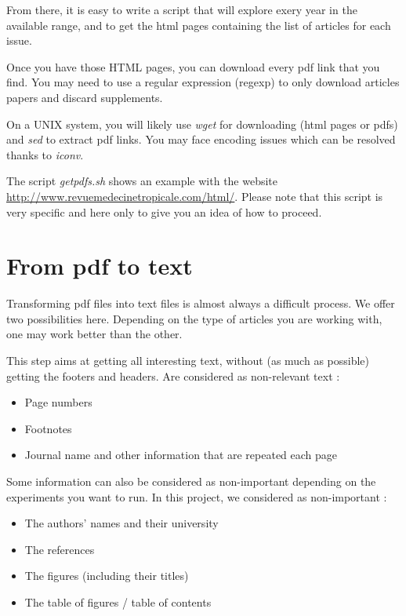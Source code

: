 \documentclass[a4paper,10pt]{article}
\begin{document}
From there, it is easy to write a script that will explore exery year
in the available range, and to get the html pages containing the list
of articles for each issue.

Once you have those HTML pages, you can download every pdf link that
you find. You may need to use a regular expression (regexp) to only
download articles papers and discard supplements.

On a UNIX system, you will likely use \emph{wget} for downloading
(html pages or pdfs) and \emph{sed} to extract pdf links. You may face
encoding issues which can be resolved thanks to \emph{iconv}.

The script \emph{getpdfs.sh} shows an example with the website
\url{http://www.revuemedecinetropicale.com/html/}. Please note that
this script is very specific and here only to give you an idea of how
to proceed.

\section{From pdf to text}
\label{sec:pdftotext}

Transforming pdf files into text files is almost always a difficult
process. We offer two possibilities here. Depending on the type of
articles you are working with, one may work better than the other.

This step aims at getting all interesting text, without (as much as
possible) getting the footers and headers. Are considered as
non-relevant text :

\begin{itemize}
\item Page numbers
\item Footnotes
\item Journal name and other information that are repeated each page
\end{itemize}

Some information can also be considered as non-important depending on
the experiments you want to run. In this project, we considered as
non-important :

\begin{itemize}
\item The authors' names and their university
\item The references
\item The figures (including their titles)
\item The table of figures / table of contents
\end{itemize}
\end{document}
